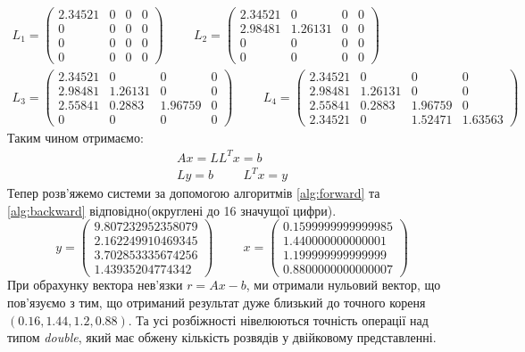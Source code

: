 \begin{gather*}
    L_1 = \begin{pmatrix}
        2.34521 & 0 & 0 & 0 \\
        0 & 0 & 0 & 0 \\
        0 & 0 & 0 & 0 \\
        0 & 0 & 0 & 0
    \end{pmatrix} \hspace{1cm}
    L_2 = \begin{pmatrix}
        2.34521 & 0 & 0 & 0 \\
        2.98481 & 1.26131 & 0 & 0 \\
        0 & 0 & 0 & 0 \\
        0 & 0 & 0 & 0
    \end{pmatrix} \\
    L_3 = \begin{pmatrix}
        2.34521 & 0 & 0 & 0 \\
        2.98481 & 1.26131 & 0 & 0 \\
        2.55841 & 0.2883 & 1.96759 & 0 \\
        0 & 0 & 0 & 0
    \end{pmatrix} \hspace{1cm}
    L_4 = \begin{pmatrix}
        2.34521 & 0 & 0 & 0 \\
        2.98481 & 1.26131 & 0 & 0 \\
        2.55841 & 0.2883 & 1.96759 & 0 \\
        2.34521 & 0 & 1.52471 & 1.63563
    \end{pmatrix}
\end{gather*}
Таким чином отримаємо:
\begin{gather*}
    Ax = LL^Tx= b \\
    Ly = b \hspace{1cm}
    L^T x = y
\end{gather*}
Тепер розв'яжемо системи за допомогою
алгоритмів \ref{alg:forward} та
\ref{alg:backward} відповідно(округлені до 16 значущої цифри).
\[
    y = \begin{pmatrix}
        9.807232952358079 \\
        2.162249910469345 \\
        3.702853335674256 \\
        1.43935204774342
    \end{pmatrix} \hspace{1cm}
    x = \begin{pmatrix}
        0.1599999999999985 \\
        1.440000000000001 \\
        1.199999999999999 \\
        0.8800000000000007
    \end{pmatrix}
\]
При обрахунку вектора нев'язки $r = Ax - b$,
ми отримали нульовий вектор, що пов'язуємо з тим,
що отриманий результат дуже близький до
точного кореня $(0.16, 1.44, 1.2, 0.88)$. Та усі розбіжності
нівелюються точність операції над типом \textit{double},
який має обжену кількість розвядів у двійковому представленні.

